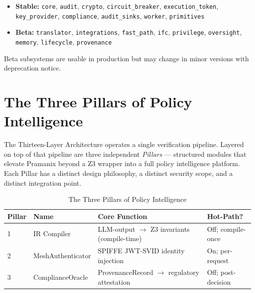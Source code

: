 \documentclass[12pt,a4paper,oneside]{report}
\newcommand{\code}[1]{\texttt{#1}}           %
\begin{document}
\begin{itemize}
  \item \textbf{Stable:} \code{core}, \code{audit}, \code{crypto},
        \code{circuit\_breaker}, \code{execution\_token}, \code{key\_provider},
        \code{compliance}, \code{audit\_sinks}, \code{worker}, \code{primitives}
  \item \textbf{Beta:} \code{translator}, \code{integrations},
        \code{fast\_path}, \code{ifc}, \code{privilege}, \code{oversight},
        \code{memory}, \code{lifecycle}, \code{provenance}
\end{itemize}

Beta subsystems are usable in production but may change in minor versions with
deprecation notice.

\chapter{The Three Pillars of Policy Intelligence}

The Thirteen-Layer Architecture operates a single verification pipeline.
Layered on top of that pipeline are three independent \textit{Pillars} ---
structured modules that elevate Pramanix beyond a Z3 wrapper into a full
policy intelligence platform.  Each Pillar has a distinct design philosophy,
a distinct security scope, and a distinct integration point.

\begin{table}[h]
\centering\small
\begin{tabular}{@{} l p{3.2cm} p{3.8cm} p{3.5cm} @{}}
\toprule
\textbf{Pillar} & \textbf{Name} & \textbf{Core Function} & \textbf{Hot-Path?} \\
\midrule
1 & IR Compiler     & LLM-output $\to$ Z3 invariants (compile-time) & Off; compile-once \\
2 & MeshAuthenticator & SPIFFE JWT-SVID identity injection            & On; per-request \\
3 & ComplianceOracle & ProvenanceRecord $\to$ regulatory attestation  & Off; post-decision \\
\bottomrule
\end{tabular}
\caption{The Three Pillars of Policy Intelligence}
\end{table}

\end{document}
